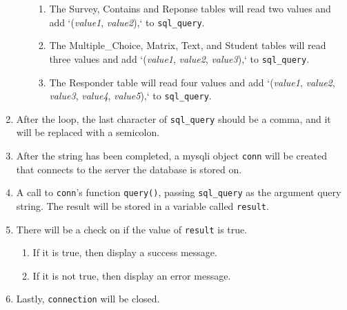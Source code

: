 \documentclass[letterpaper,10pt,serif, draftclsnofoot,onecolumn, compsoc, titlepage]{IEEEtran}
\begin{document}
\begin{enumerate}
\begin{enumerate}
\begin{enumerate}
			\item The Survey, Contains and Reponse tables will read two values and add `(\emph{value1}, \emph{value2}),` to \texttt{sql\_query}.
			\item The Multiple\_Choice, Matrix, Text, and Student tables will read three values and add `(\emph{value1}, \emph{value2}, \emph{value3}),` to \texttt{sql\_query}.
			\item The Responder table will read four values and add `(\emph{value1}, \emph{value2}, \emph{value3}, \emph{value4}, \emph{value5}),` to \texttt{sql\_query}.
		\end{enumerate}
	\end{enumerate}
	\item After the loop, the last character of \texttt{sql\_query} should be a comma, and it will be replaced with a semicolon.
	\item After the string has been completed, a mysqli object \texttt{conn} will be created that connects to the server the database is stored on.
	\item A call to \texttt{conn}'s function \texttt{query()}, passing \texttt{sql\_query} as the argument query string.
				The result will be stored in a variable called \texttt{result}.
	\item There will be a check on if the value of \texttt{result} is true.
	\begin{enumerate}
		\item If it is true, then display a success message.
		\item If it is not true, then display an error message.
	\end{enumerate}
	\item Lastly, \texttt{connection} will be closed.
\end{enumerate}
\end{document}
